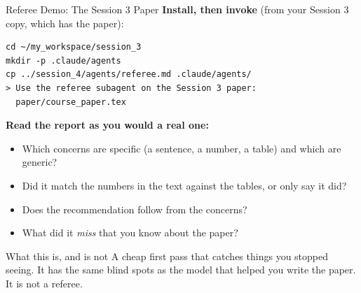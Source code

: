 \documentclass[aspectratio=169, 11pt]{beamer}
\begin{document}
\begin{frame}[fragile]{Referee Demo: The Session 3 Paper}
  \textbf{Install, then invoke} (from your Session 3 copy, which has the paper):
  \begin{lstlisting}[basicstyle=\ttfamily\scriptsize]
cd ~/my_workspace/session_3
mkdir -p .claude/agents
cp ../session_4/agents/referee.md .claude/agents/
> Use the referee subagent on the Session 3 paper:
  paper/course_paper.tex
  \end{lstlisting}

  \vspace{0.3em}
  \textbf{Read the report as you would a real one:}
  \begin{itemize}\small
    \item Which concerns are specific (a sentence, a number, a table) and which are generic?
    \item Did it match the numbers in the text against the tables, or only say it did?
    \item Does the recommendation follow from the concerns?
    \item What did it \emph{miss} that you know about the paper?
  \end{itemize}

  \vspace{0.4em}
  \begin{alertblock}{What this is, and is not}
    A cheap first pass that catches things you stopped seeing. It has the same blind spots as the model that helped you write the paper. It is not a referee.
  \end{alertblock}
\end{frame}
\end{document}
